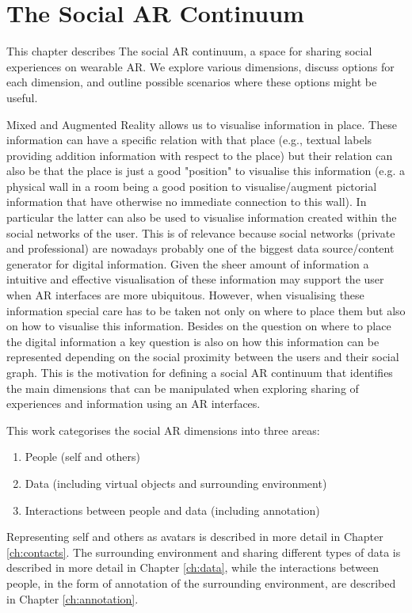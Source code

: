 \chapter{The Social AR Continuum}
\label{ch:continuum}

This chapter describes The social AR continuum, a space for sharing social experiences on wearable AR. We explore various dimensions, discuss options for each dimension, and outline possible scenarios where these options might be useful.

Mixed and Augmented Reality allows us to visualise information in place. These information can have a specific relation with that place (e.g., textual labels providing addition information with respect to the place) but their relation can also be that the place is just a good "position" to visualise this information (e.g. a physical wall in a room being a good position to visualise/augment pictorial information that have otherwise no immediate connection to this wall). In particular the latter can also be used to visualise information created within the social networks of the user. This is of relevance because social networks (private and professional) are nowadays probably one of the biggest data source/content generator for digital information. Given the sheer amount of information a intuitive and effective visualisation of these information may support the user when AR interfaces are more ubiquitous. However, when visualising these information special care has to be taken not only on where to place them but also on how to visualise this information. Besides on the question on where to place the digital information a key question is also on how this information can be represented depending on the social proximity between the users and their social graph. This is the motivation for defining a social AR continuum that identifies the main dimensions that can be manipulated when exploring sharing of experiences and information using an AR interfaces. 

This work categorises the social AR dimensions into three areas: 
\begin{enumerate}
    \item People (self and others)
    \item Data (including virtual objects and surrounding environment)
    \item Interactions between people and data (including annotation)
\end{enumerate}

Representing self and others as avatars is described in more detail in Chapter \ref{ch:contacts}. The surrounding environment and sharing different types of data is described in more detail in Chapter \ref{ch:data}, while the interactions between people, in the form of annotation of the surrounding environment, are described in Chapter \ref{ch:annotation}.

